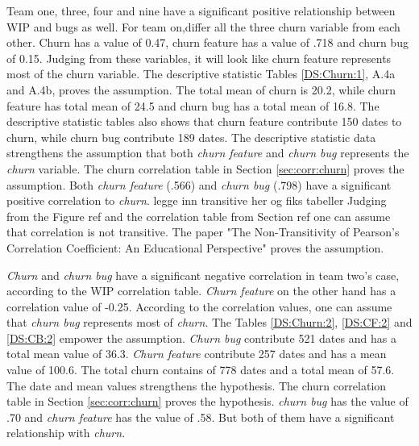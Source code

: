 \documentclass[UKenglish]{ifimaster}  %
\begin{document}
Team one, three, four and nine have a significant positive relationship between WIP and bugs as well. For team on,differ all the three churn variable from each other. Churn has a value of 0.47, churn feature has a value of .718 and churn bug of 0.15.  Judging from these variables, it will look like churn feature represents most of the churn variable. The descriptive statistic Tables \ref{DS:Churn:1}, A.4a and A.4b,  proves the assumption. The total mean of churn is 20.2, while churn feature has total mean of 24.5 and churn bug has a total mean of 16.8. The descriptive statistic tables also shows that churn feature contribute 150 dates to churn, while churn bug contribute 189 dates. The descriptive statistic data strengthens the assumption that both \textit{churn feature} and \textit{churn bug} represents the \textit{churn} variable. The churn correlation table in Section \ref{sec:corr:churn} proves the assumption. Both \textit{churn feature} (.566) and \textit{churn bug} (.798) have a significant positive correlation to \textit{churn}. legge inn transitive her og fiks tabeller 
Judging from the Figure ref and the correlation table from Section ref one can assume that correlation is not transitive. The paper "The Non-Transitivity of Pearson's Correlation Coefficient: An Educational Perspective" \parencite{corr:transitive} proves the assumption. 






\textit{Churn} and \textit{churn bug} have a significant negative correlation in team two's case, according to the WIP correlation table. \textit{Churn feature} on the other hand has a correlation value of -0.25. According to the correlation values, one can assume that \textit{churn bug} represents most of \textit{churn}. The Tables \ref{DS:Churn:2}, \ref{DS:CF:2} and \ref{DS:CB:2} empower the assumption. \textit{Churn bug} contribute 521 dates and has a total mean value of 36.3. \textit{Churn feature} contribute 257 dates and has a mean value of 100.6. The total churn contains of 778 dates and a total mean of 57.6. The date and mean values strengthens the hypothesis. The churn correlation table in Section \ref{sec:corr:churn} proves the hypothesis. \textit{churn bug} has the value of .70 and \textit{churn feature} has the value of .58.  But both of them have a significant relationship with \textit{churn}.
\end{document}
